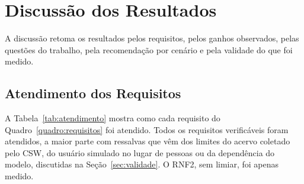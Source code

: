 \section{Discussão dos Resultados}
\label{sec:discussao}

A discussão retoma os resultados pelos requisitos, pelos ganhos observados, pelas questões do trabalho, pela recomendação por cenário e pela validade do que foi medido.

\subsection{Atendimento dos Requisitos}
\label{sec:atendimento}

A Tabela~\ref{tab:atendimento} mostra como cada requisito do Quadro~\ref{quadro:requisitos} foi atendido. Todos os requisitos verificáveis foram atendidos, a maior parte com ressalvas que vêm dos limites do acervo coletado pelo CSW, do usuário simulado no lugar de pessoas ou da dependência do modelo, discutidas na Seção~\ref{sec:validade}. O RNF2, sem limiar, foi apenas medido.

